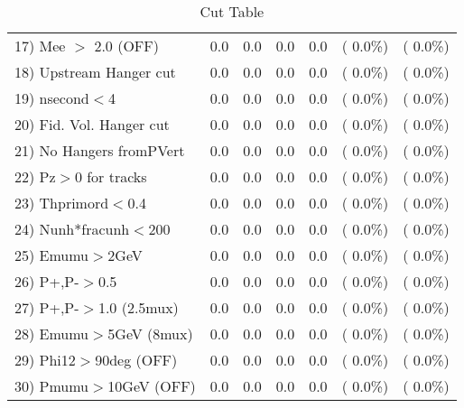 \begin{table}[h!]
\begin{tabular}{||l||r|r|r|r|r|r||}
 17) Mee $>$ 2.0  (OFF)   &          0.0 &          0.0 &          0.0 &          0.0 & (  0.0\%) & (  0.0\%) \\
 18) Upstream Hanger cut  &          0.0 &          0.0 &          0.0 &          0.0 & (  0.0\%) & (  0.0\%) \\
 19) nsecond$<$4          &          0.0 &          0.0 &          0.0 &          0.0 & (  0.0\%) & (  0.0\%) \\
 20) Fid. Vol. Hanger cut &          0.0 &          0.0 &          0.0 &          0.0 & (  0.0\%) & (  0.0\%) \\
 21) No Hangers fromPVert &          0.0 &          0.0 &          0.0 &          0.0 & (  0.0\%) & (  0.0\%) \\
 22) Pz$>$0 for tracks    &          0.0 &          0.0 &          0.0 &          0.0 & (  0.0\%) & (  0.0\%) \\
 23) Thprimord$<$0.4      &          0.0 &          0.0 &          0.0 &          0.0 & (  0.0\%) & (  0.0\%) \\
 24) Nunh*fracunh$<$200   &          0.0 &          0.0 &          0.0 &          0.0 & (  0.0\%) & (  0.0\%) \\
 25) Emumu$>$2GeV         &          0.0 &          0.0 &          0.0 &          0.0 & (  0.0\%) & (  0.0\%) \\
 26) P+,P-$>$0.5          &          0.0 &          0.0 &          0.0 &          0.0 & (  0.0\%) & (  0.0\%) \\
 27) P+,P-$>$1.0 (2.5mux) &          0.0 &          0.0 &          0.0 &          0.0 & (  0.0\%) & (  0.0\%) \\
 28) Emumu$>$5GeV  (8mux) &          0.0 &          0.0 &          0.0 &          0.0 & (  0.0\%) & (  0.0\%) \\
 29) Phi12$>$90deg  (OFF) &          0.0 &          0.0 &          0.0 &          0.0 & (  0.0\%) & (  0.0\%) \\
 30) Pmumu$>$10GeV  (OFF) &          0.0 &          0.0 &          0.0 &          0.0 & (  0.0\%) & (  0.0\%) \\
 \hline
 \hline
 \end{tabular}
 \caption{Cut Table           }
 \label{tab-cutcohjpsi-mumu_anuecc}
 \end{table}
